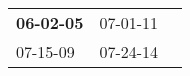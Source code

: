 \begin{supertabular}{p{0.33\columnwidth}p{0.33\columnwidth}p{0.33\columnwidth}}
 \textbf{06-02-05\textsuperscript{}} &  07-01-11\textsuperscript{} \\
          07-15-09\textsuperscript{} &  07-24-14\textsuperscript{} \\
\end{supertabular}
